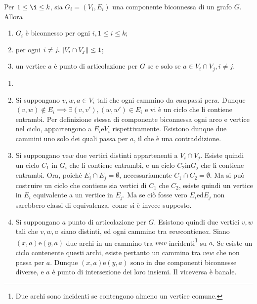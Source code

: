 \documentclass{subfiles}
\begin{document}
\begin{Lemma}
    Per \(1 \le \i \le k\), sia \(G_{i} = (V_{i}, E_{i})\) una componente biconnessa di un grafo \(G\). Allora
    \begin{enumerate}
        \item \(G_{i}\) è biconnesso per ogni \(i, 1 \le i \le k\);
        \item per ogni \(i \neq j, \norm{V_{i} \cap V_{j}} \le 1\);
        \item un vertice \(a\) è punto di articolazione per \(G\) se e solo se \(a \in V_{i} \cap V_{j}, i \neq j\).
    \end{enumerate}

    \begin{Proof*}
        \begin{enumerate}
            \item []
            \item Si suppongano \(v, w, a \in V_{i}\) tali che ogni cammino da \(v \text{a} w \text{passi per} a\).
                  Dunque \((v, w) \notin E_{i} \implies \exists (v, v'), (w, w') \in E_{i}\) e vi è un ciclo che li contiene entrambi.
                  Per definizione stessa di componente biconnessa ogni arco e vertice nel ciclo, appartengono a \(E_{i} \text{e} V_{i}\) rispettivamente.
                  Esistono dunque due cammini uno solo dei quali passa per \(a\), il che è una contraddizione.

            \item Si suppongano \(v \text{e} w\) due vertici distinti appartenenti a \(V_{i} \cap V_{j}\). Esiste quindi un ciclo \(C_{1}\) in \(G_{i}\) che li contiene entrambi,
                  e un ciclo \(C_{2} \text{in} G_{j}\) che li contiene entrambi. Ora, poiché \(E_{i} \cap E_{j} = \emptyset\), necessariamente \(C_{1} \cap C_{2} = \emptyset\).
                  Ma si può costruire un ciclo che contiene sia vertici di \(C_{1}\) che \(C_{2}\), esiste quindi un vertice in \(E_{i}\) equivalente a un vertice in \(E_{j}\).
                  Ma se ciò fosse vero \(E_{i} \text{ed} E_{j}\) non sarebbero classi di equivalenza, come si è invece supposto.

            \item Si suppongano \(a\) punto di articolazione per \(G\). Esistono quindi due vertici \(v, w\) tali che \(v, w, a\) siano distinti,
                  ed ogni cammino tra \(v \text{e} w \text{contiene} a\).
                  Siano \((x, a) \text{e} (y, a)\) due archi in un cammino tra \(v \text{e} w\) incidenti\footnote[10]{Due archi sono incidenti se contengono almeno un vertice comune.} su \(a\).
                  Se esiste un ciclo contenente questi archi, esiste pertanto un cammino tra \(v \text{e} w\) che non passa per \(a\).
                  Dunque \((x, a) \text{e} (y, a)\) sono in due componenti biconnesse diverse, e \(a\) è punto di intersezione dei loro insiemi.
                  Il viceversa è banale.
        \end{enumerate}
    \end{Proof*}
\end{Lemma}
\end{document}
